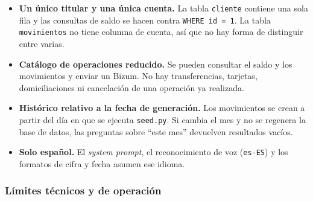 \begin{itemize}
    \item \textbf{Un único titular y una única cuenta.} La tabla
    \texttt{cliente} contiene una sola fila y las consultas de saldo se hacen
    contra \texttt{WHERE id = 1}. La tabla \texttt{movimientos} no tiene columna
    de cuenta, así que no hay forma de distinguir entre varias.

    \item \textbf{Catálogo de operaciones reducido.} Se pueden consultar el
    saldo y los movimientos y enviar un Bizum. No hay transferencias, tarjetas,
    domiciliaciones ni cancelación de una operación ya realizada.

    \item \textbf{Histórico relativo a la fecha de generación.} Los movimientos
    se crean a partir del día en que se ejecuta \texttt{seed.py}. Si cambia el
    mes y no se regenera la base de datos, las preguntas sobre ``este mes''
    devuelven resultados vacíos.

    \item \textbf{Solo español.} El \textit{system prompt}, el reconocimiento de
    voz (\texttt{es-ES}) y los formatos de cifra y fecha asumen ese idioma.
\end{itemize}

\subsubsection{Límites técnicos y de operación}

